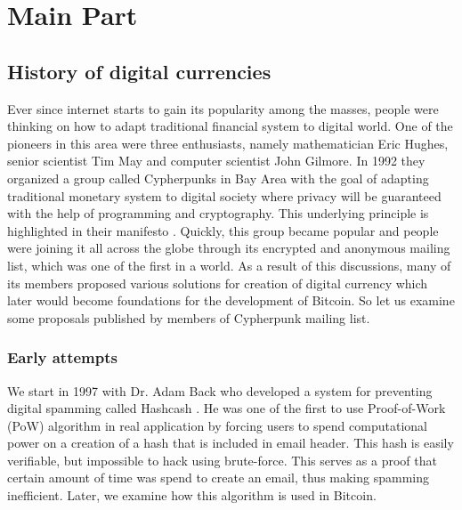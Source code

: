 \documentclass[conference,compsoc]{IEEEtran}
\begin{document}


\section{Main Part}

\subsection{History of digital currencies}
Ever since internet starts to gain its popularity among the masses, people were thinking on how to adapt traditional financial system to digital world. 
One of the pioneers in this area were three enthusiasts, namely mathematician Eric Hughes, senior scientist Tim May and computer scientist John Gilmore.
In 1992 they organized a group called Cypherpunks in Bay Area with the goal of adapting traditional monetary system to digital society where privacy will be guaranteed with the help of programming and cryptography. 
This underlying principle is highlighted in their manifesto \cite{manifesto}.
Quickly, this group became popular and people were joining it all across the globe through its encrypted and anonymous mailing list, which was one of the first in a world. 
As a result of this discussions, many of its members proposed various solutions for creation of digital currency which later would become foundations for the development of Bitcoin. 
So let us examine some proposals published by members of Cypherpunk mailing list.

\subsubsection{Early attempts}
We start in 1997 with Dr. Adam Back who developed a system for preventing digital spamming called Hashcash \cite{hashcash}. 
He was one of the first to use Proof-of-Work (PoW) algorithm in real application by forcing users to spend computational power on a creation of a hash that is included in email header. 
This hash is easily verifiable, but impossible to hack using brute-force. 
This serves as a proof that certain amount of time was spend to create an email, thus making spamming inefficient. 
Later, we examine how this algorithm is used in Bitcoin. 
\end{document}
